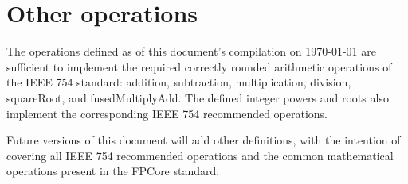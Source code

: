 \documentclass[letterpaper,10pt]{article}
\begin{document}
\section{Other operations}

The operations defined as of this document's compilation on \today\; are sufficient to implement the required correctly rounded arithmetic operations of the IEEE 754 standard: addition, subtraction, multiplication, division, squareRoot, and fusedMultiplyAdd. The defined integer powers and roots also implement the corresponding IEEE 754 recommended operations.

Future versions of this document will add other definitions, with the intention of covering all IEEE 754 recommended operations and the common mathematical operations present in the FPCore standard.

%
%
\end{document}
